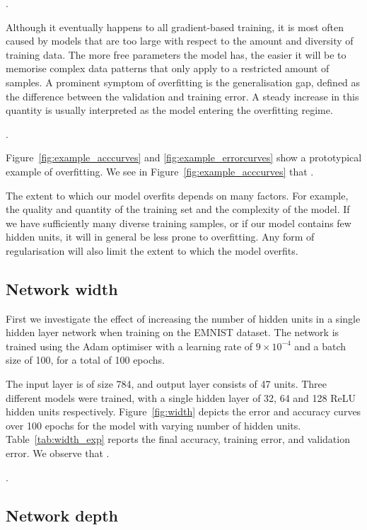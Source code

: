 \documentclass{article}
\begin{document}
\questionFive.

Although it eventually happens to all gradient-based training, it is most often caused by models that are too large with respect to the amount and diversity of training data. The more free parameters the model has, the easier it will be to memorise complex data patterns that only apply to a restricted amount of samples.
A prominent symptom of overfitting is the generalisation gap, defined as the difference between the validation and training error. 
A steady increase in this quantity is usually interpreted as the model entering the overfitting regime.

\questionSix.

Figure~\ref{fig:example_acccurves} and \ref{fig:example_errorcurves} show a prototypical example of overfitting.
We see in Figure~\ref{fig:example_acccurves} that \questionSeven.

The extent to which our model overfits depends on many factors.
For example, the quality and quantity of the training set and the complexity of the model. 
If we have sufficiently many diverse training samples, or if our model contains few hidden units, it will in general be less prone to overfitting. 
Any form of regularisation will also limit the extent to which the model overfits.


\subsection{Network width}

\questionTableOne
\questionFigureTwo

First we investigate the effect of increasing the number of hidden units in a single hidden layer network when training on the EMNIST dataset.
The network is trained using the Adam optimiser
with a learning rate of $9 \times 10^{-4}$ and a batch size of 100, for a total of 100 epochs.

The input layer is of size 784, and output layer consists of 47 units. 
Three different models were trained, with a single hidden layer of 32, 64 and 128 ReLU hidden units respectively.
Figure~\ref{fig:width} depicts the error and accuracy curves over 100 epochs for the model with varying number of hidden units.
Table~\ref{tab:width_exp} reports the final accuracy, training error, and validation error.
We observe that \questionEight.

\questionNine.


\subsection{Network depth}
\end{document}

